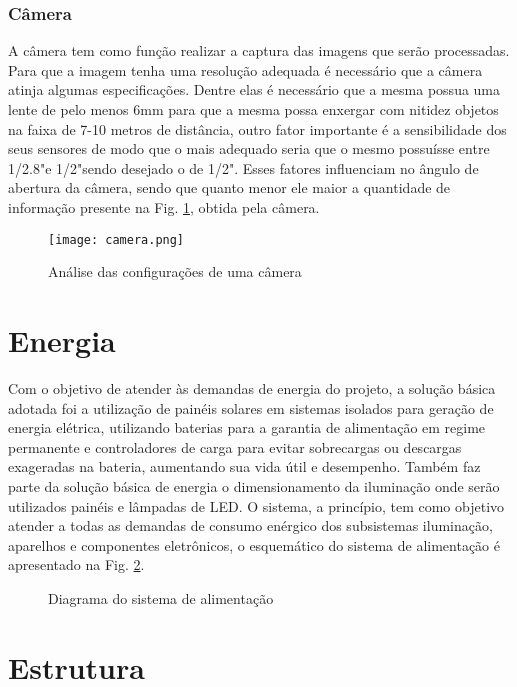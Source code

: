 \subsubsection{Câmera} 

A câmera tem como função realizar a captura das imagens que serão processadas.  Para que a imagem tenha uma resolução adequada é necessário que a câmera atinja algumas especificações. Dentre elas é necessário que a mesma possua uma lente de pelo menos 6mm para que a mesma possa enxergar com nitidez objetos na faixa de 7-10 metros de distância, outro fator importante é a sensibilidade dos seus sensores de modo que o mais adequado seria que o mesmo possuísse entre 1/2.8"e 1/2"sendo desejado o de 1/2". Esses fatores influenciam no ângulo de abertura da câmera, sendo que quanto menor ele maior a quantidade de informação presente na Fig. \ref{fig:camera}, obtida pela câmera.

\begin{figure}[!htb]
    \centering
        \texttt{[image: camera.png]} 
    \caption{Análise das configurações de uma câmera}
    \label{fig:camera}
\end{figure}

\section{Energia}

Com o objetivo de atender às demandas de energia do projeto, a solução básica adotada foi a utilização de painéis solares em sistemas isolados para geração de energia elétrica, utilizando baterias para a garantia de alimentação em regime permanente e controladores de carga para evitar sobrecargas ou descargas exageradas na bateria, aumentando sua vida útil e desempenho. Também faz parte da solução básica de energia o dimensionamento da iluminação onde serão utilizados painéis e lâmpadas de LED. O sistema, a princípio, tem como objetivo atender a todas as demandas de consumo enérgico dos subsistemas iluminação, aparelhos e componentes eletrônicos, o esquemático do sistema de alimentação é apresentado na Fig. \ref{fig:diagrama_energia}.

\begin{figure}[!htb]
	\caption{\label{fig:diagrama_energia} Diagrama do sistema de alimentação}
\end{figure}

\section{Estrutura}

